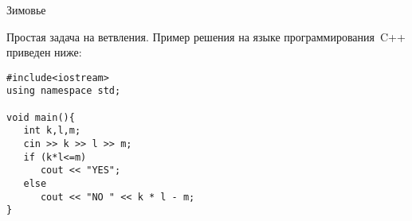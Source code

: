 \begin{tutorial}{Зимовье}

Простая задача на ветвления. Пример решения на языке программирования~C++ приведен ниже:
\begin{verbatim}
#include<iostream>
using namespace std;

void main(){
   int k,l,m;
   cin >> k >> l >> m;
   if (k*l<=m)
      cout << "YES";
   else
      cout << "NO " << k * l - m;
}
\end{verbatim}

\end{tutorial}

